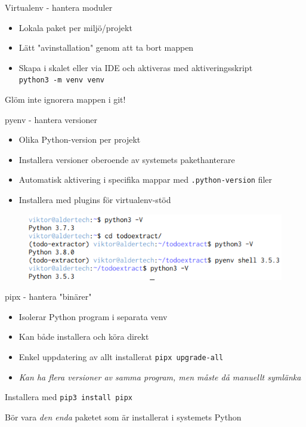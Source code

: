 \begin{frame}{Virtualenv - hantera moduler}
  \begin{itemize}
    \item Lokala paket per miljö/projekt
    \item Lätt "avinstallation" genom att ta bort mappen
    \item Skapa i skalet eller via IDE och aktiveras med aktiveringsskript\\
          \texttt{python3 -m venv venv}\\
  \end{itemize}

  Glöm inte ignorera mappen i git!
\end{frame}

\begin{frame}{pyenv - hantera versioner}
  \begin{itemize}
    \item Olika Python-version per projekt
    \item Installera versioner oberoende av systemets pakethanterare
    \item Automatisk aktivering i specifika mappar med \texttt{.python-version} filer
    \item Installera med plugins för virtualenv-stöd
  \end{itemize}

  \vfill

  \begin{figure}
    \includegraphics[width=0.8\linewidth,keepaspectratio]{fig/pyenv}
  \end{figure}
\end{frame}

\begin{frame}{pipx - hantera "binärer"}
  \begin{itemize}
    \item Isolerar Python program i separata venv
    \item Kan både installera och köra direkt
    \item Enkel uppdatering av allt installerat \texttt{pipx upgrade-all}
    \item \emph{Kan ha flera versioner av samma program, men måste då manuellt symlänka}
  \end{itemize}

  Installera med \texttt{pip3 install pipx}

  Bör vara \emph{den enda} paketet som är installerat i systemets Python
\end{frame}
